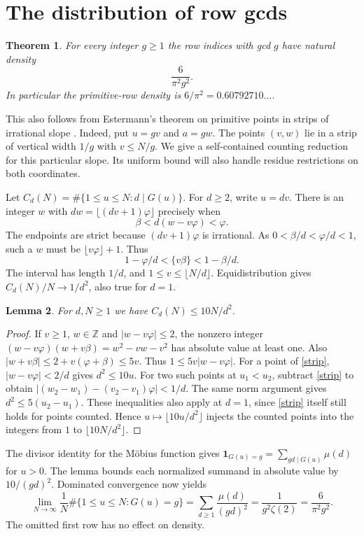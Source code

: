 \documentclass[11pt]{article}
\newtheorem{theorem}{Theorem}
\newtheorem{lemma}[theorem]{Lemma}
\newcommand{\ph}{\varphi}
\newcommand{\fl}[1]{\lfloor #1\rfloor}
\newcommand{\fr}[1]{\{#1\}}
\begin{document}
\section{The distribution of row gcds}
\begin{theorem}\label{density}
For every integer $g\ge1$ the row indices with gcd $g$ have natural density
\[
 \frac{6}{\pi^2 g^2}.
\]
In particular the primitive-row density is $6/\pi^2=0.60792710\ldots$.
\end{theorem}
This also follows from Estermann's theorem on primitive points in strips
of irrational slope \cite{estermann}. Indeed, put $u=gv$ and $a=gw$.
The points $(v,w)$ lie in a strip of vertical width $1/g$ with $v\le N/g$.
We give a self-contained counting reduction for this particular slope. Its
uniform bound will also handle residue restrictions on both coordinates.

Let $C_d(N)=\#\{1\le u\le N:d\mid G(u)\}$. For $d\ge2$, write $u=dv$.
There is an integer $w$ with $dw=\fl{(dv+1)\ph}$ precisely when
\begin{equation}\label{strip}
 \beta<d(w-v\ph)<\ph.
\end{equation}
The endpoints are strict because $(dv+1)\ph$ is irrational.
As $0<\beta/d<\ph/d<1$, such a $w$ must be $\fl{v\ph}+1$. Thus
\[
 1-\ph/d < \fr{v\beta} < 1-\beta/d .
\]
The interval has length $1/d$, and $1\le v\le\fl{N/d}$. Equidistribution
gives $C_d(N)/N\to1/d^2$, also true for $d=1$.

\begin{lemma}\label{majorant}
For $d,N\ge1$ we have $C_d(N)\le10N/d^2$.
\end{lemma}
\begin{proof}
If $v\ge1$, $w\in\mathbb Z$ and $|w-v\ph|\le2$, the nonzero integer
$(w-v\ph)(w+v\beta)=w^2-vw-v^2$ has absolute value at least one. Also
$|w+v\beta|\le2+v(\ph+\beta)\le5v$. Thus $1\le5v|w-v\ph|$.
For a point of \eqref{strip}, $|w-v\ph|<2/d$ gives $d^2\le10u$.
For two such points at $u_1<u_2$, subtract \eqref{strip} to obtain
$|(w_2-w_1)-(v_2-v_1)\ph|<1/d$. The same norm argument gives
$d^2\le5(u_2-u_1)$. These inequalities also apply at $d=1$, since
\eqref{strip} itself still holds for points counted. Hence
$u\mapsto\fl{10u/d^2}$ injects the counted points into the integers
from $1$ to $\fl{10N/d^2}$.
\end{proof}

The divisor identity for the Möbius function gives
$\mathbf1_{G(u)=g}=\sum_{gd\mid G(u)}\mu(d)$ for $u>0$.
The lemma bounds each normalized summand in absolute value by
$10/(gd)^2$. Dominated convergence now yields
\[
 \lim_{N\to\infty}\frac1N\#\{1\le u\le N:G(u)=g\}
 =\sum_{d\ge1}\frac{\mu(d)}{(gd)^2}
 =\frac{1}{g^2\zeta(2)}=\frac{6}{\pi^2g^2}.
\]
The omitted first row has no effect on density.
\end{document}

